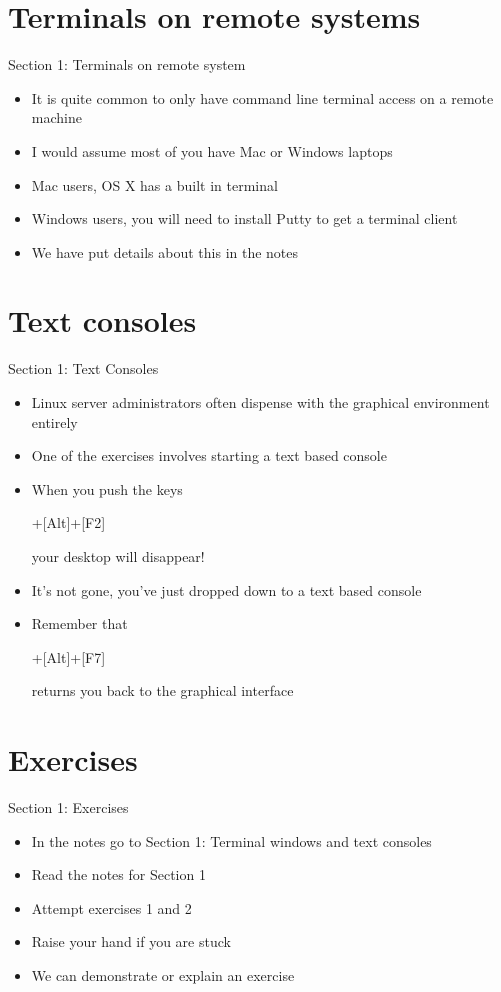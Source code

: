 \section{Terminals on remote systems}
\begin{frame}{Section 1: Terminals on remote system}
\begin{itemize}
\item It is quite common to only have command line terminal access on a remote machine
\item I would assume most of you have Mac or Windows laptops
\item Mac users, OS X has a built in terminal
\item Windows users, you will need to install Putty to get a terminal client
\item We have put details about this in the notes
\end{itemize}
\end{frame}

\section{Text consoles}
\begin{frame}{Section 1: Text Consoles}
\begin{itemize}
\item Linux server administrators often dispense with the graphical environment entirely
\item One of the exercises involves starting a text based console
\item When you push the keys \begin{semiverbatim}[Ctrl]+[Alt]+[F2]\end{semiverbatim} your desktop will disappear!
\item It's not gone, you've just dropped down to a text based console
\item Remember that \begin{semiverbatim}[Ctrl]+[Alt]+[F7]\end{semiverbatim} returns you back to the graphical interface
\end{itemize}
\end{frame}

\section{Exercises}
\begin{frame}{Section 1: Exercises}
\begin{itemize}
\item In the notes go to Section 1: Terminal windows and text consoles
\item Read the notes for Section 1 
\item Attempt exercises 1 and 2
\item Raise your hand if you are stuck
\item We can demonstrate or explain an exercise
\end{itemize}
\end{frame}